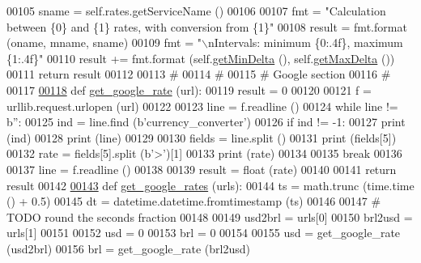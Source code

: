 \begin{DoxyCode}
00105         sname = self.rates.getServiceName ()
00106         
00107         fmt = \textcolor{stringliteral}{"Calculation between \{0\} and \{1\} rates, with conversion from \{1\}"}
00108         result = fmt.format (oname, mname, sname)
00109         fmt = \textcolor{stringliteral}{"\(\backslash\)nIntervals: minimum \{0:.4f\}, maximum \{1:.4f\}"}
00110         result += fmt.format (self.\hyperlink{classraw__urlparser_1_1_differences_af19faaea85ca8ac0d327c8443ddd99ef}{getMinDelta} (), self.\hyperlink{classraw__urlparser_1_1_differences_acfa09d743c08cc813a5bc435aa6875da}{getMaxDelta} ())
00111         \textcolor{keywordflow}{return} result
00112 
00113 \textcolor{comment}{#        }
00114 \textcolor{comment}{# }
00115 \textcolor{comment}{# Google section }
00116 \textcolor{comment}{#}
00117 
\hypertarget{raw__urlparser_8py_source.tex_l00118}{}\hyperlink{namespaceraw__urlparser_a4faaced9140d84b3f953c21eb1c4a19d}{00118} \textcolor{keyword}{def }\hyperlink{namespaceraw__urlparser_a4faaced9140d84b3f953c21eb1c4a19d}{get\_google\_rate} (url):
00119     result = 0
00120 
00121     f = urllib.request.urlopen (url)
00122     
00123     line = f.readline ()
00124     \textcolor{keywordflow}{while} line != b\textcolor{stringliteral}{''}:
00125         ind = line.find (b\textcolor{stringliteral}{'currency\_converter'})
00126         \textcolor{keywordflow}{if} ind != -1:
00127             \textcolor{keywordflow}{print} (ind)
00128             \textcolor{keywordflow}{print} (line)
00129             
00130             fields = line.split ()
00131             \textcolor{keywordflow}{print} (fields[5])
00132             rate = fields[5].split (b\textcolor{stringliteral}{'>'})[1]
00133             \textcolor{keywordflow}{print} (rate)
00134             
00135             \textcolor{keywordflow}{break}
00136             
00137         line = f.readline ()
00138     
00139     result = float (rate)
00140     
00141     \textcolor{keywordflow}{return} result
00142     
\hypertarget{raw__urlparser_8py_source.tex_l00143}{}\hyperlink{namespaceraw__urlparser_aa5905f1b040de4865980526ac3c6a16c}{00143} \textcolor{keyword}{def }\hyperlink{namespaceraw__urlparser_aa5905f1b040de4865980526ac3c6a16c}{get\_google\_rates} (urls):
00144     ts = math.trunc (time.time () + 0.5)
00145     dt = datetime.datetime.fromtimestamp (ts)
00146     
00147     \textcolor{comment}{# TODO round the seconds fraction}
00148     
00149     usd2brl = urls[0]
00150     brl2usd = urls[1]
00151     
00152     usd = 0
00153     brl = 0
00154     
00155     usd = get\_google\_rate (usd2brl)
00156     brl = get\_google\_rate (brl2usd)

\end{DoxyCode}
